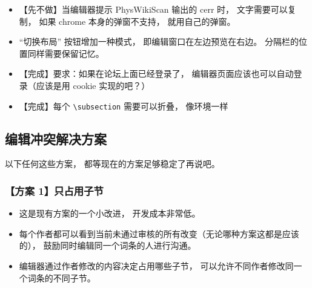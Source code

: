 \begin{itemize}
\item 【先不做】当编辑器提示 PhysWikiScan 输出的 cerr 时， 文字需要可以复制， 如果 chrome 本身的弹窗不支持， 就用自己的弹窗。

\item “切换布局” 按钮增加一种模式， 即编辑窗口在左边预览在右边。 分隔栏的位置同样需要保留记忆。

\item 【完成】要求：如果在论坛上面已经登录了， 编辑器页面应该也可以自动登录（应该是用 cookie 实现的吧？）

\item 【完成】每个 \verb|\subsection| 需要可以折叠， 像环境一样
\end{itemize}

\subsection{编辑冲突解决方案}

以下任何这些方案， 都等现在的方案足够稳定了再说吧。

\subsubsection{【方案 1】只占用子节}
\begin{itemize}
\item 这是现有方案的一个小改进， 开发成本非常低。
\item 每个作者都可以看到当前未通过审核的所有改变（无论哪种方案这都是应该的）， 鼓励同时编辑同一个词条的人进行沟通。
\item 编辑器通过作者修改的内容决定占用哪些子节， 可以允许不同作者修改同一个词条的不同子节。
\end{itemize}

